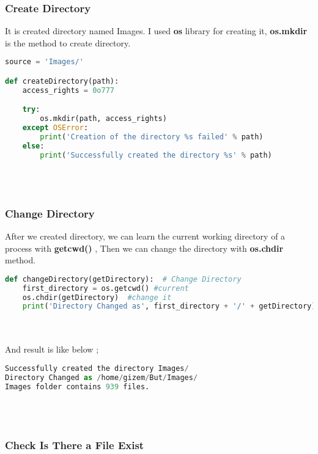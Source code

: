 \documentclass[onecolumn]{article}
\begin{document}
\subsubsection{Create Directory }

It is created directory named Images. I used \textbf{os} library for creating it,\textbf{ os.mkdir} is the method to create directory.

\begin{lstlisting}[language=Python, caption= Create Directory]
source = 'Images/'

def createDirectory(path): 
    access_rights = 0o777

    try:
        os.mkdir(path, access_rights) 
    except OSError:
        print('Creation of the directory %s failed' % path)
    else:
        print('Successfully created the directory %s' % path)

\end{lstlisting} \\ \\

\subsubsection{Change Directory }

After we created directory, we can learn the  current working directory of a process with \textbf{ getcwd() } , Then we can change the directory with  \textbf{os.chdir} method.

\begin{lstlisting}[language=Python, caption= Change Directory]
def changeDirectory(getDirectory):  # Change Directory 
    first_directory = os.getcwd() #current 
    os.chdir(getDirectory)  #change it
    print('Directory Changed as', first_directory + '/' + getDirectory)
\end{lstlisting} \\ \\

And result is like below ; 

\begin{lstlisting}[language=Python, caption= Output]
Successfully created the directory Images/
Directory Changed as /home/gizem/But/Images/
Images folder contains 939 files.
\end{lstlisting} \\ \\


\subsubsection{Check Is There a File Exist}
\end{document}
